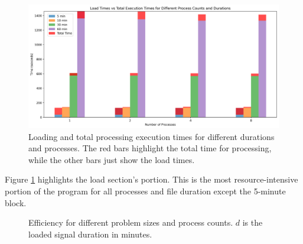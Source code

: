 \begin{figure}[!h]
    \centering
    \includegraphics[scale=0.50]{figures/judasex.png}
    \caption{Loading and total processing execution times for different durations and processes. The red bars highlight the total time for processing, while the other bars just show the load times.}
    \label{fig:judasextime}
\end{figure}

Figure \ref{fig:judasextime} highlights the load section's portion. This is the most resource-intensive portion of the program for all processes and file duration except the 5-minute block. 


\begin{figure}[!htbp]
\centering
{}
\caption{Efficiency for different problem sizes and process counts. $d$ is the loaded signal duration in minutes.}
\label{fig:judasefficiency}
\end{figure}

